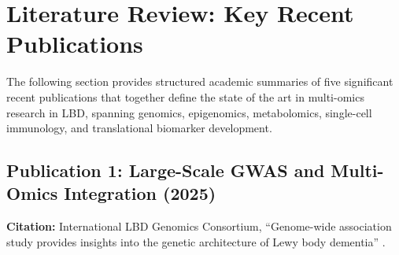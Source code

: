 \section{Literature Review: Key Recent Publications}
\label{sec:literature_review}

The following section provides structured academic summaries of five significant recent publications that together define the state of the art in multi-omics research in LBD, spanning genomics, epigenomics, metabolomics, single-cell immunology, and translational biomarker development.

\subsection{Publication 1: Large-Scale GWAS and Multi-Omics Integration (2025)}
\textbf{Citation:} International LBD Genomics Consortium, ``Genome-wide association study provides insights into the genetic architecture of Lewy body dementia'' \cite{chia2025gwas}.

